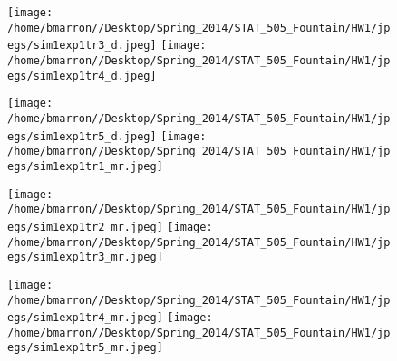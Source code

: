 \documentclass[a4paper,11pt]{article}
\begin{document}
\newpage
\begin{figure}
    \texttt{[image: /home/bmarron//Desktop/Spring\_2014/STAT\_505\_Fountain/HW1/jpegs/sim1exp1tr3\_d.jpeg]}
     \texttt{[image: /home/bmarron//Desktop/Spring\_2014/STAT\_505\_Fountain/HW1/jpegs/sim1exp1tr4\_d.jpeg]}
\end{figure}

\newpage
\begin{figure}
    \texttt{[image: /home/bmarron//Desktop/Spring\_2014/STAT\_505\_Fountain/HW1/jpegs/sim1exp1tr5\_d.jpeg]}
     \texttt{[image: /home/bmarron//Desktop/Spring\_2014/STAT\_505\_Fountain/HW1/jpegs/sim1exp1tr1\_mr.jpeg]}
\end{figure}

\newpage
\begin{figure}
    \texttt{[image: /home/bmarron//Desktop/Spring\_2014/STAT\_505\_Fountain/HW1/jpegs/sim1exp1tr2\_mr.jpeg]}
     \texttt{[image: /home/bmarron//Desktop/Spring\_2014/STAT\_505\_Fountain/HW1/jpegs/sim1exp1tr3\_mr.jpeg]}
\end{figure}

\newpage
\begin{figure}
    \texttt{[image: /home/bmarron//Desktop/Spring\_2014/STAT\_505\_Fountain/HW1/jpegs/sim1exp1tr4\_mr.jpeg]}
     \texttt{[image: /home/bmarron//Desktop/Spring\_2014/STAT\_505\_Fountain/HW1/jpegs/sim1exp1tr5\_mr.jpeg]}
\end{figure}
\end{document}
